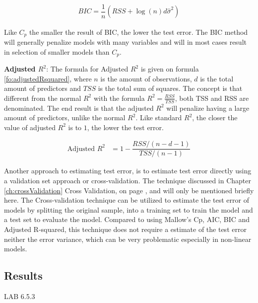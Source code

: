 \begin{align}\label{fo:BIC}
BIC = \dfrac{1}{n} (RSS + \log(n) d \hat{\sigma}^2)
\end{align}

Like $C_p$ the smaller the result of BIC, the lower the test error. The BIC method will generally penalize models with many variables and will in most cases result in selection of smaller models than $C_p$.

\textbf{Adjusted $R^2$}: The formula for Adjusted $R^2$ is given on formula \ref{fo:adjustedRsquared}, where $n$ is the amount of observations, $d$ is the total amount of predictors and $TSS$ is the total sum of squares. The concept is that different from the normal $R^2$ with the formula $R^2 = \tfrac{RSS}{TSS}$, both TSS and RSS  are denominated. The end result is that the adjusted $R^2$ will penalize having a large amount of predictors, unlike the normal $R^2$. Like standard $R^2$, the closer the value of adjusted $R^2$ is to $1$, the lower the test error.

\begin{align}\label{fo:adjustedRsquared}
	\text{Adjusted } R^2 &= 1 - \dfrac{RSS/(n-d-1)}{TSS/(n-1)}
\end{align}

Another approach to estimating test error, is to estimate test error directly using a validation set approach or cross-validation. The technique discussed in Chapter \ref{ch:crossValidation} Cross Validation, on page \pageref{ch:crossValidation}, and will only be mentioned briefly here. The Cross-validation technique can be utilized to estimate the test error of models by splitting the original sample, into a training set to train the model and a test set to evaluate the model. Compared to using Mallow's Cp, AIC, BIC and Adjusted R-squared, this technique does not require a estimate of the test error neither the error variance, which can be very problematic especially in non-linear models.

\subsection{Results}
LAB 6.5.3